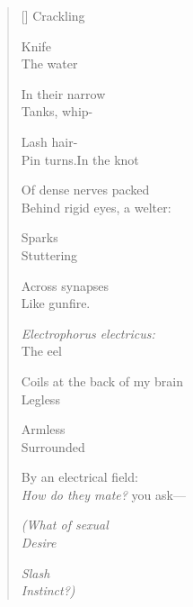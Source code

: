 \label{ch:eels}
\settowidth{\versewidth}{Coils at the back of my brain}
\begin{verse}[\versewidth]
Crackling

Knife\\
The water

In their narrow\\
Tanks, whip-

Lash hair-\\
Pin turns.\qquad In the knot

Of dense nerves packed\\
Behind rigid eyes, a welter:

Sparks\\
Stuttering

Across synapses\\
Like gunfire.

\textit{Electrophorus electricus:}\\
The eel

Coils at the back of my brain\\
Legless

Armless\\
Surrounded

By an electrical field:\\
\textit{How do they mate?} you ask---

\textit{(What of sexual\\
Desire}

\textit{Slash\\
Instinct?)}
\end{verse}
